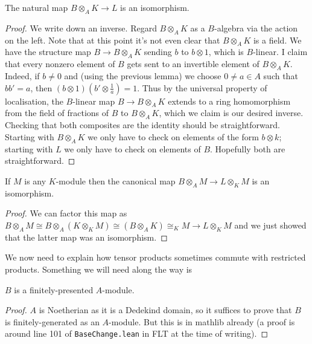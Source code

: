 \begin{corollary}
  \label{TODOtemplabel4}
  The natural map $B\otimes_AK\to L$ is an isomorphism.
\end{corollary}
\begin{proof}

We write down an inverse. Regard $B\otimes_AK$ as a $B$-algebra via the action on the left.
Note that at this point it's not even clear that $B\otimes_AK$ is a field. We have the
structure map $B\to B\otimes_AK$ sending $b$ to $b\otimes1$, which is $B$-linear. I claim
that every nonzero element of $B$ gets sent to an invertible element of $B\otimes_AK$.
Indeed, if $b\not=0$ and (using the previous lemma) we choose $0\not=a\in A$ such that
$bb'=a$, then $(b\otimes1)(b'\otimes\frac1a)=1$. Thus by the universal property of
localisation, the $B$-linear map $B\to B\otimes_AK$ extends to a ring homomorphism from the field
of fractions of $B$ to $B\otimes_AK$, which we claim is our desired inverse.
Checking that both composites are the identity should be straightforward. Starting
with $B\otimes_AK$ we only have to check on elements of the form $b\otimes k$;
starting with $L$ we only have to check on elements of $B$. Hopefully both are
straightforward.
\end{proof}

\begin{corollary}
  \label{TODOtemplabel5}
  If $M$ is any $K$-module then the canonical map $B\otimes_A M\to L\otimes_K M$
  is an isomorphism.
\end{corollary}
\begin{proof} We can factor this map as $B\otimes_AM\cong B\otimes_A(K\otimes_KM)\cong
  (B\otimes_A K)\cong_KM\to L\otimes_KM$ and we just showed that the latter map was an
  isomorphism.
\end{proof}

We now need to explain how tensor products sometimes commute with restricted products.
Something we will need along the way is

\begin{theorem} $B$ is a finitely-presented $A$-module.
  \label{TODOtemplabel6}
\end{theorem}
\begin{proof} $A$ is Noetherian as it is a Dedekind domain, so it suffices to prove that $B$ is finitely-generated as an $A$-module. But this is in mathlib already (a proof is
  around line 101 of {\tt BaseChange.lean} in FLT at the time of writing).
\end{proof}

